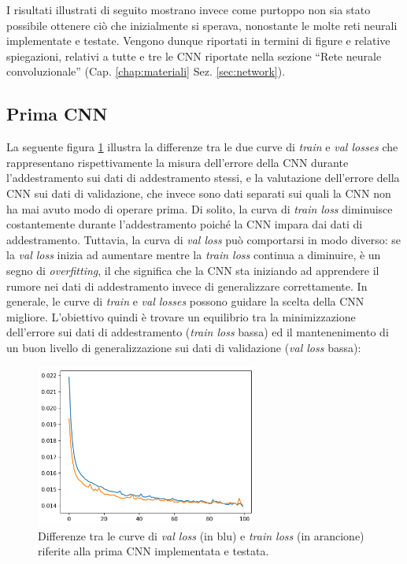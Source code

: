 \documentclass[12pt,italian]{report}
\begin{document}
I risultati illustrati di seguito mostrano invece come purtoppo non sia stato possibile ottenere ciò che inizialmente si sperava, nonostante le molte reti neurali implementate e testate. Vengono dunque riportati in termini di figure e relative spiegazioni, relativi a tutte e tre le CNN riportate nella sezione ``Rete neurale convoluzionale'' (Cap. \ref{chap:materiali} Sez. \ref{sec:network}).


\subsection{Prima CNN}
\label{subsec:prima_risultati}

La seguente figura \ref{fig:prima_cnn_primo_plot} illustra la differenze tra le due curve di \textit{train} e \textit{val losses} che rappresentano rispettivamente la misura dell'errore della CNN durante l'addestramento sui dati di addestramento stessi, e la valutazione dell'errore della CNN sui dati di validazione, che invece sono dati separati sui quali la CNN non ha mai avuto modo di operare prima. Di solito, la curva di \textit{train loss} diminuisce costantemente durante l'addestramento poiché la CNN impara dai dati di addestramento. Tuttavia, la curva di \textit{val loss} può comportarsi in modo diverso: se la \textit{val loss} inizia ad aumentare mentre la \textit{train loss} continua a diminuire, è un segno di \textit{overfitting}, il che significa che la CNN sta iniziando ad apprendere il rumore nei dati di addestramento invece di generalizzare correttamente. In generale, le curve di \textit{train} e \textit{val losses} possono guidare la scelta della CNN migliore. L'obiettivo quindi è trovare un equilibrio tra la minimizzazione dell'errore sui dati di addestramento (\textit{train loss} bassa) ed il mantenenimento di un buon livello di generalizzazione sui dati di validazione (\textit{val loss} bassa):

\begin{figure}[H]
    \centering
    \includegraphics[width=0.65\textwidth]{immagini/prima_cnn_primo_plot.png}
    \captionsetup{justification=centering}
    \caption{Differenze tra le curve di \textit{val loss} (in blu) e \textit{train loss} (in arancione) riferite alla prima CNN implementata e testata.}
    \label{fig:prima_cnn_primo_plot}
\end{figure}
\end{document}
